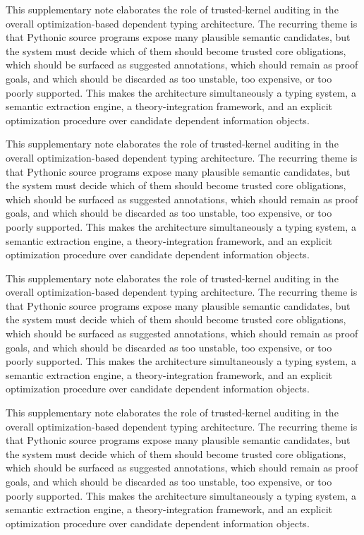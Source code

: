 \documentclass[11pt]{article}
\theoremstyle{definition}
\theoremstyle{plain}
\begin{document}
This supplementary note elaborates the role of trusted-kernel auditing in the overall
optimization-based dependent typing architecture. The recurring theme is that
Pythonic source programs expose many plausible semantic candidates, but the
system must decide which of them should become trusted core obligations, which
should be surfaced as suggested annotations, which should remain as proof
goals, and which should be discarded as too unstable, too expensive, or too
poorly supported. This makes the architecture simultaneously a typing system,
a semantic extraction engine, a theory-integration framework, and an explicit
optimization procedure over candidate dependent information objects.

This supplementary note elaborates the role of trusted-kernel auditing in the overall
optimization-based dependent typing architecture. The recurring theme is that
Pythonic source programs expose many plausible semantic candidates, but the
system must decide which of them should become trusted core obligations, which
should be surfaced as suggested annotations, which should remain as proof
goals, and which should be discarded as too unstable, too expensive, or too
poorly supported. This makes the architecture simultaneously a typing system,
a semantic extraction engine, a theory-integration framework, and an explicit
optimization procedure over candidate dependent information objects.

This supplementary note elaborates the role of trusted-kernel auditing in the overall
optimization-based dependent typing architecture. The recurring theme is that
Pythonic source programs expose many plausible semantic candidates, but the
system must decide which of them should become trusted core obligations, which
should be surfaced as suggested annotations, which should remain as proof
goals, and which should be discarded as too unstable, too expensive, or too
poorly supported. This makes the architecture simultaneously a typing system,
a semantic extraction engine, a theory-integration framework, and an explicit
optimization procedure over candidate dependent information objects.

This supplementary note elaborates the role of trusted-kernel auditing in the overall
optimization-based dependent typing architecture. The recurring theme is that
Pythonic source programs expose many plausible semantic candidates, but the
system must decide which of them should become trusted core obligations, which
should be surfaced as suggested annotations, which should remain as proof
goals, and which should be discarded as too unstable, too expensive, or too
poorly supported. This makes the architecture simultaneously a typing system,
a semantic extraction engine, a theory-integration framework, and an explicit
optimization procedure over candidate dependent information objects.
\end{document}
